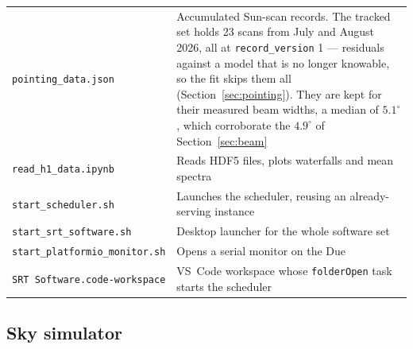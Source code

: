 \documentclass[11pt,a4paper]{article}
\begin{document}
\begin{table}[H]
\begin{tabular}{lp{9.0cm}}
\texttt{pointing\_data.json} & Accumulated Sun-scan records. The tracked set holds 23 scans from July and August 2026, all at \texttt{record\_version} 1 --- residuals against a model that is no longer knowable, so the fit skips them all (Section~\ref{sec:pointing}). They are kept for their measured beam widths, a median of $5.1^\circ$, which corroborate the $4.9^\circ$ of Section~\ref{sec:beam} \\
\texttt{read\_h1\_data.ipynb} & Reads HDF5 files, plots waterfalls and mean spectra \\
\texttt{start\_scheduler.sh} & Launches the scheduler, reusing an already-serving instance \\
\texttt{start\_srt\_software.sh} & Desktop launcher for the whole software set \\
\texttt{start\_platformio\_monitor.sh} & Opens a serial monitor on the Due \\
\texttt{SRT Software.code-workspace} & VS~Code workspace whose \texttt{folderOpen} task starts the scheduler \\
\bottomrule
\end{tabular}
\end{table}

\subsection{Sky simulator}
\end{document}
